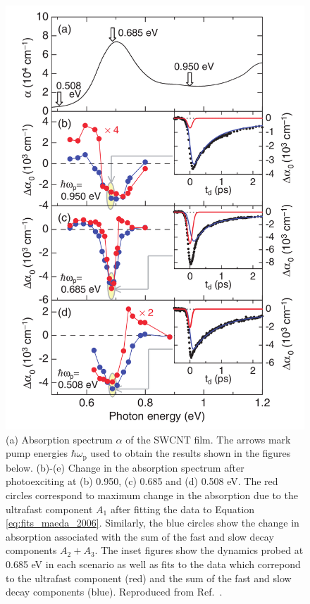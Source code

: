 \begin{figure}[H]
	\centering
	\includegraphics[scale=0.2]{images/chapter_prior_works/dtt_maeda_2006}
	\caption{(a) Absorption spectrum $\alpha$ of the SWCNT film. The arrows mark pump energies $\hbar \omega_\text{p}$ used to obtain the results shown in the figures below. (b)-(e) Change in the absorption spectrum after photoexciting at (b) 0.950, (c) 0.685 and (d) 0.508 eV. The red circles correspond to maximum change in the absorption due to the ultrafast component $A_1$ after fitting the data to Equation \eqref{eq:fits_maeda_2006}. Similarly, the blue circles show the change in absorption associated with the sum of the fast and slow decay components $A_2 + A_3$. The inset figures show the dynamics probed at 0.685 eV in each scenario as well as fits to the data which correpond to the ultrafast component (red) and the sum of the fast and slow decay components (blue). Reproduced from Ref.\ \cite{maeda2006gigantic}.}
	\label{fig:dtt_maeda_2006}
\end{figure}

